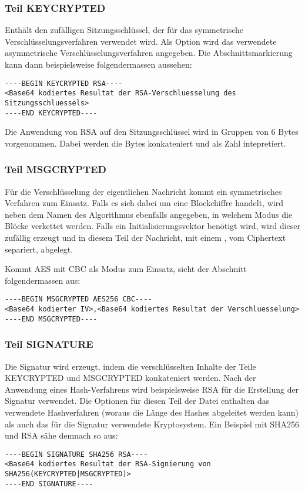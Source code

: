 \documentclass[11pt,a4paper,parskip=half]{scrartcl}
\begin{document}
\subsubsection{Teil KEYCRYPTED}
Enthält den zufälligen \glqq{}Sitzungsschlüssel\grqq{}, der für das symmetrische Verschlüsselungsverfahren verwendet wird. Als Option wird das verwendete asymmetrische Verschlüsselungsverfahren angegeben. Die Abschnittsmarkierung kann dann beispielsweise folgendermassen aussehen:
\begin{lstlisting}
----BEGIN KEYCRYPTED RSA----
<Base64 kodiertes Resultat der RSA-Verschluesselung des Sitzungsschluessels>
----END KEYCRYPTED----
\end{lstlisting}

Die Anwendung von RSA auf den Sitzungsschlüssel wird in Gruppen von 6 Bytes vorgenommen. Dabei werden die Bytes konkateniert und als Zahl intepretiert.

\subsubsection{Teil MSGCRYPTED}
Für die Verschlüsselung der eigentlichen Nachricht kommt ein symmetrisches Verfahren zum Einsatz. Falls es sich dabei um eine Blockchiffre handelt, wird neben dem Namen des Algorithmus ebenfalls angegeben, in welchem Modus die Blöcke verkettet werden. Falls ein Initialisierungsvektor benötigt wird, wird dieser zufällig erzeugt und in diesem Teil der Nachricht, mit einem \glqq{},\grqq{} vom Ciphertext separiert, abgelegt.

Kommt AES mit CBC als Modus zum Einsatz, sieht der Abschnitt folgendermassen aus:
\begin{lstlisting}
----BEGIN MSGCRYPTED AES256 CBC----
<Base64 kodierter IV>,<Base64 kodiertes Resultat der Verschluesselung>
----END MSGCRYPTED----
\end{lstlisting}

\subsubsection{Teil SIGNATURE}
Die Signatur wird erzeugt, indem die verschlüsselten Inhalte der Teile KEYCRYPTED und MSGCRYPTED konkateniert werden. Nach der Anwendung eines Hash-Verfahrens wird beispielsweise RSA für die Erstellung der Signatur verwendet. Die Optionen für diesen Teil der Datei enthalten das verwendete Hashverfahren (woraus die Länge des Hashes abgeleitet werden kann) als auch das für die Signatur verwendete Kryptosystem. Ein Beispiel mit SHA256 und RSA sähe demnach so aus:
\begin{lstlisting}
----BEGIN SIGNATURE SHA256 RSA----
<Base64 kodiertes Resultat der RSA-Signierung von SHA256(KEYCRYPTED|MSGCRYPTED)>
----END SIGNATURE----
\end{lstlisting}
\end{document}
